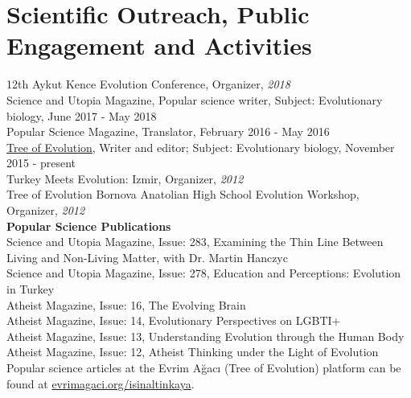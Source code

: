 \documentclass[letterpaper,10.5pt]{article}
\begin{document}
\section{Scientific Outreach, Public Engagement and Activities}
12th Aykut Kence Evolution Conference, Organizer, \textit{2018} \\
Science and Utopia Magazine, Popular science writer, Subject: Evolutionary biology, June 2017 - May 2018 \\
Popular Science Magazine, Translator, February 2016 - May 2016 \\
\href{https://evrimagaci.org/isinaltinkaya/}{Tree of Evolution}, Writer and editor; Subject: Evolutionary biology, November 2015 - present \\
Turkey Meets Evolution: Izmir, Organizer, \textit{2012} \\
Tree of Evolution Bornova Anatolian High School Evolution Workshop, Organizer, \textit{2012} \\
\medskip
\textbf{Popular Science Publications} \\
Science and Utopia Magazine, Issue: 283, Examining the Thin Line Between Living and Non-Living Matter, with Dr. Martin Hanczyc \\
Science and Utopia Magazine, Issue: 278, Education and Perceptions: Evolution in Turkey \\
Atheist Magazine, Issue: 16, The Evolving Brain \\
Atheist Magazine, Issue: 14, Evolutionary Perspectives on LGBTI+ \\
Atheist Magazine, Issue: 13, Understanding Evolution through the Human Body \\
Atheist Magazine, Issue: 12, Atheist Thinking under the Light of Evolution \\
Popular science articles at the Evrim A\u{g}ac{\i} (Tree of Evolution) platform can be found at  \href{https://evrimagaci.org/isinaltinkaya/}{evrimagaci.org/isinaltinkaya}. 




\end{document}
